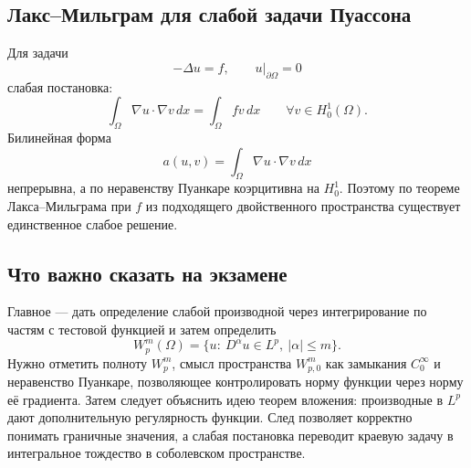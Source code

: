\subsection{Лакс--Мильграм для слабой задачи Пуассона}

Для задачи
\[
-\Delta u=f,\qquad u|_{\partial\Omega}=0
\]
слабая постановка:
\[
    \int_\Omega \nabla u\cdot\nabla v\,dx
    =\int_\Omega fv\,dx
    \qquad \forall v\in H_0^1(\Omega).
\]
Билинейная форма
\[
    a(u,v)=\int_\Omega\nabla u\cdot\nabla v\,dx
\]
непрерывна, а по неравенству Пуанкаре коэрцитивна на $H_0^1$. Поэтому по теореме
Лакса--Мильграма при $f$ из подходящего двойственного пространства существует
единственное слабое решение.

\subsection{Что важно сказать на экзамене}

Главное --- дать определение слабой производной через интегрирование по частям
с тестовой функцией и затем определить
\[
    W_p^m(\Omega)=\{u:\ D^\alpha u\in L^p,
    \ |\alpha|\leq m\}.
\]
Нужно отметить полноту $W_p^m$, смысл пространства $W_{p,0}^m$ как замыкания
$C_0^\infty$ и неравенство Пуанкаре, позволяющее контролировать норму функции
через норму её градиента. Затем следует объяснить идею теорем вложения:
производные в $L^p$ дают дополнительную регулярность функции. След позволяет корректно понимать
граничные значения, а слабая постановка переводит краевую задачу в интегральное
тождество в соболевском пространстве.

\newpage
